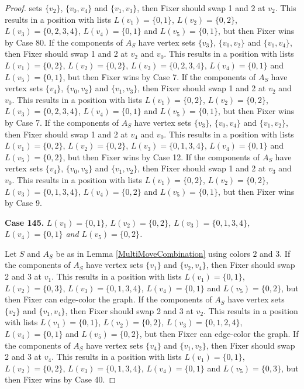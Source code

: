 \documentclass[12pt]{amsart}
\theoremstyle{plain}
\theoremstyle{definition}
\theoremstyle{remark}
\begin{document}
\begin{proof}
sets $\{v_2\}$, $\{v_0, v_4\}$ and $\{v_1, v_3\}$, then Fixer should swap 1 and 2 at $v_2$. This results in a position with lists $L(v_1) = \{0, 1\}$, $L(v_2) = \{0, 2\}$, $L(v_3) = \{0, 2, 3, 4\}$, $L(v_4) = \{0, 1\}$ and $L(v_5) = \{0, 1\}$, but then Fixer wins by Case 80. If the components of $A_S$ have vertex sets $\{v_3\}$, $\{v_0, v_2\}$ and $\{v_1, v_4\}$, then Fixer should swap 1 and 2 at $v_2$ and $v_0$. This results in a position with lists $L(v_1) = \{0, 2\}$, $L(v_2) = \{0, 2\}$, $L(v_3) = \{0, 2, 3, 4\}$, $L(v_4) = \{0, 1\}$ and $L(v_5) = \{0, 1\}$, but then Fixer wins by Case 7. If the components of $A_S$ have vertex sets $\{v_4\}$, $\{v_0, v_2\}$ and $\{v_1, v_3\}$, then Fixer should swap 1 and 2 at $v_2$ and $v_0$. This results in a position with lists $L(v_1) = \{0, 2\}$, $L(v_2) = \{0, 2\}$, $L(v_3) = \{0, 2, 3, 4\}$, $L(v_4) = \{0, 1\}$ and $L(v_5) = \{0, 1\}$, but then Fixer wins by Case 7. If the components of $A_S$ have vertex sets $\{v_3\}$, $\{v_0, v_4\}$ and $\{v_1, v_2\}$, then Fixer should swap 1 and 2 at $v_4$ and $v_0$. This results in a position with lists $L(v_1) = \{0, 2\}$, $L(v_2) = \{0, 2\}$, $L(v_3) = \{0, 1, 3, 4\}$, $L(v_4) = \{0, 1\}$ and $L(v_5) = \{0, 2\}$, but then Fixer wins by Case 12. If the components of $A_S$ have vertex sets $\{v_4\}$, $\{v_0, v_3\}$ and $\{v_1, v_2\}$, then Fixer should swap 1 and 2 at $v_3$ and $v_0$. This results in a position with lists $L(v_1) = \{0, 2\}$, $L(v_2) = \{0, 2\}$, $L(v_3) = \{0, 1, 3, 4\}$, $L(v_4) = \{0, 2\}$ and $L(v_5) = \{0, 1\}$, but then Fixer wins by Case 9. 

\noindent\textbf{Case 145.  }\textit{$L(v_1) = \{0, 1\}$, $L(v_2) = \{0, 2\}$, $L(v_3) = \{0, 1, 3, 4\}$, $L(v_4) = \{0, 1\}$ and $L(v_5) = \{0, 2\}$.}

Let $S$ and $A_S$ be as in Lemma \ref{MultiMoveCombination} using colors $2$ and $3$. If the components of $A_S$ have vertex sets $\{v_1\}$ and $\{v_2, v_4\}$, then Fixer should swap 2 and 3 at $v_1$. This results in a position with lists $L(v_1) = \{0, 1\}$, $L(v_2) = \{0, 3\}$, $L(v_3) = \{0, 1, 3, 4\}$, $L(v_4) = \{0, 1\}$ and $L(v_5) = \{0, 2\}$, but then Fixer can edge-color the graph. If the components of $A_S$ have vertex sets $\{v_2\}$ and $\{v_1, v_4\}$, then Fixer should swap 2 and 3 at $v_2$. This results in a position with lists $L(v_1) = \{0, 1\}$, $L(v_2) = \{0, 2\}$, $L(v_3) = \{0, 1, 2, 4\}$, $L(v_4) = \{0, 1\}$ and $L(v_5) = \{0, 2\}$, but then Fixer can edge-color the graph. If the components of $A_S$ have vertex sets $\{v_4\}$ and $\{v_1, v_2\}$, then Fixer should swap 2 and 3 at $v_4$. This results in a position with lists $L(v_1) = \{0, 1\}$, $L(v_2) = \{0, 2\}$, $L(v_3) = \{0, 1, 3, 4\}$, $L(v_4) = \{0, 1\}$ and $L(v_5) = \{0, 3\}$, but then Fixer wins by Case 40. 


\end{proof}
\end{document}
